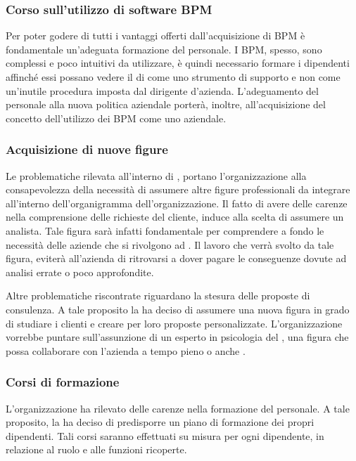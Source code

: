 \subsubsection{Corso sull'utilizzo di software BPM}
Per poter godere di tutti i vantaggi offerti dall'acquisizione di \sw BPM è fondamentale un'adeguata formazione del personale. I \sw BPM, spesso, sono complessi e poco intuitivi da utilizzare, è quindi necessario formare i dipendenti affinché essi possano 
vedere il \sw di  come uno strumento di supporto e non come un'inutile procedura imposta dal dirigente d'azienda.
L'adeguamento del personale alla nuova politica aziendale porterà, inoltre, all'acquisizione del concetto dell'utilizzo dei \sw BPM come uno  aziendale.

\subsubsection{Acquisizione di nuove figure}
Le problematiche rilevata all'interno di \customer , portano l'organizzazione alla consapevolezza della necessità di assumere altre figure professionali da integrare all'interno dell'organigramma dell'organizzazione.
Il fatto di avere delle carenze nella comprensione delle richieste del cliente, induce \customer alla scelta di assumere un analista. Tale figura sarà infatti fondamentale per comprendere a fondo le necessità delle aziende che si rivolgono ad \customer. Il lavoro che verrà svolto da tale figura, eviterà all'azienda di ritrovarsi a dover pagare le conseguenze dovute ad analisi errate o poco approfondite.

Altre problematiche riscontrate riguardano la stesura delle proposte di consulenza. A tale proposito la \customer ha deciso di assumere una nuova figura in grado di studiare i clienti e creare per loro proposte personalizzate. L'organizzazione vorrebbe puntare sull'assunzione di un esperto in psicologia del \mktg , una figura che possa collaborare con l'azienda a tempo pieno o anche .


\subsubsection{Corsi di formazione} 
L'organizzazione ha rilevato delle carenze nella formazione del personale. A tale proposito, la \customer ha deciso di predisporre un piano di formazione dei propri dipendenti. Tali corsi saranno effettuati su misura per ogni dipendente, in relazione al ruolo e alle funzioni ricoperte. 

